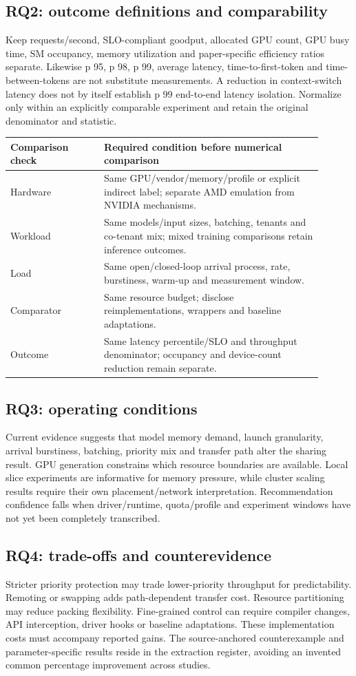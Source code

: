 \documentclass[12pt,a4paper]{article}
\begin{document}
\subsection{RQ2: outcome definitions and comparability}
Keep requests/second, SLO-compliant goodput, allocated GPU count, GPU busy time, SM occupancy, memory utilization and paper-specific efficiency ratios separate. Likewise p 95, p 98, p 99, average latency, time-to-first-token and time-between-tokens are not substitute measurements. A reduction in context-switch latency does not by itself establish p 99 end-to-end latency isolation. Normalize only within an explicitly comparable experiment and retain the original denominator and statistic.

\begin{longtable}{P{0.27\linewidth}P{0.63\linewidth}}
\toprule Comparison check & Required condition before numerical comparison\\\midrule\endhead
Hardware & Same GPU/vendor/memory/profile or explicit indirect label; separate AMD emulation from NVIDIA mechanisms.\\
Workload & Same models/input sizes, batching, tenants and co-tenant mix; mixed training comparisons retain inference outcomes.\\
Load & Same open/closed-loop arrival process, rate, burstiness, warm-up and measurement window.\\
Comparator & Same resource budget; disclose reimplementations, wrappers and baseline adaptations.\\
Outcome & Same latency percentile/SLO and throughput denominator; occupancy and device-count reduction remain separate.\\
\bottomrule\end{longtable}

\subsection{RQ3: operating conditions}
Current evidence suggests that model memory demand, launch granularity, arrival burstiness, batching, priority mix and transfer path alter the sharing result. GPU generation constrains which resource boundaries are available. Local slice experiments are informative for memory pressure, while cluster scaling results require their own placement/network interpretation. Recommendation confidence falls when driver/runtime, quota/profile and experiment windows have not yet been completely transcribed.

\subsection{RQ4: trade-offs and counterevidence}
Stricter priority protection may trade lower-priority throughput for predictability. Remoting or swapping adds path-dependent transfer cost. Resource partitioning may reduce packing flexibility. Fine-grained control can require compiler changes, API interception, driver hooks or baseline adaptations. These implementation costs must accompany reported gains. The source-anchored counterexample and parameter-specific results reside in the extraction register, avoiding an invented common percentage improvement across studies.
\end{document}
